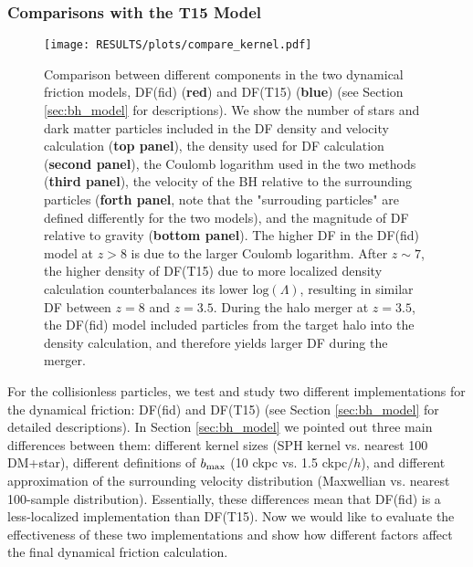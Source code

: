 \subsubsection{Comparisons with the T15 Model}
\label{subsec:df100}
\begin{figure}
\texttt{[image: RESULTS/plots/compare\_kernel.pdf]}

\caption{ Comparison between different components in the two dynamical friction models, DF(fid) (\textbf{red}) and DF(T15) (\textbf{blue}) (see Section \ref{sec:bh_model} for descriptions). We show the number of stars and dark matter particles included in the DF density and velocity calculation (\textbf{top panel}), the density used for DF calculation (\textbf{second panel}), the Coulomb logarithm used in the two methods (\textbf{third panel}), the velocity of the BH relative to the surrounding particles (\textbf{forth panel}, note that the "surrouding particles" are defined differently for the two models), and the magnitude of DF relative to gravity (\textbf{bottom panel}). The higher DF in the DF(fid) model at $z>8$ is due to the larger Coulomb logarithm. After $z\sim 7$, the higher density of DF(T15) due to more localized density calculation counterbalances its lower $\text{log}(\Lambda)$, resulting in similar DF between $z=8$ and $z=3.5$. During the halo merger at $z=3.5$, the DF(fid) model included particles from the target halo into the density calculation, and therefore yields larger DF during the merger.}
\label{fig:k100_case1}
\end{figure}


For the collisionless particles, we test and study two different implementations for the dynamical friction: DF(fid) and DF(T15) (see Section \ref{sec:bh_model} for detailed descriptions). In Section \ref{sec:bh_model} we pointed out three main differences between them: different kernel sizes (SPH kernel vs. nearest 100 DM+star), different definitions of $b_{\rm max}$ (10 ckpc vs. 1.5 ckpc$/h$), and different approximation of the surrounding velocity distribution (Maxwellian vs. nearest 100-sample distribution). Essentially, these differences mean that DF(fid) is a less-localized implementation than DF(T15). Now we would like to evaluate the effectiveness of these two implementations and show how different factors affect the final dynamical friction calculation.


